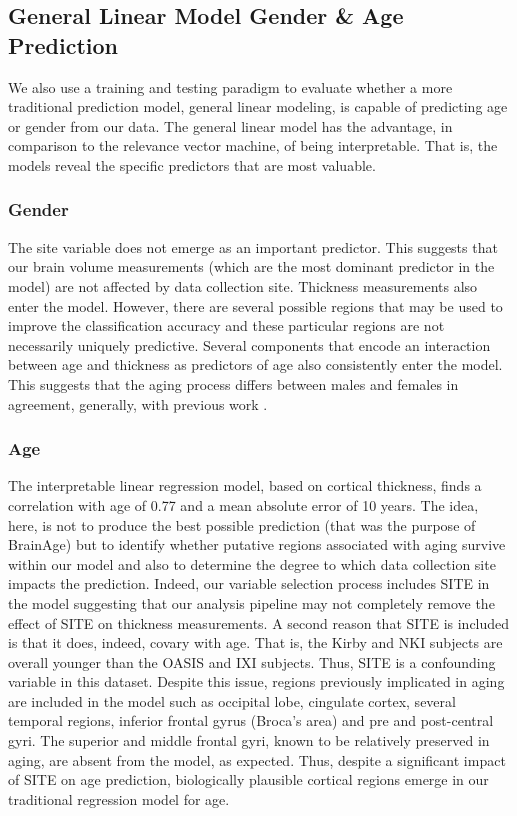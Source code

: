 \subsection{General Linear Model Gender \& Age Prediction} 
We also use a training and testing paradigm to evaluate whether a more
traditional prediction model, general linear modeling, is capable of
predicting age or gender from our data.  The general linear model has
the advantage, in comparison to the relevance vector machine, of being
interpretable.  That is, the models reveal the specific predictors
that are most valuable.  

\subsubsection{Gender} 
The site variable does not emerge as an important predictor.  This
suggests that our brain volume measurements (which are the most
dominant predictor in the model) are not affected by data collection
site.  Thickness measurements also enter the model.  However, there
are several possible regions that may be used to improve the
classification accuracy and these particular regions are not
necessarily uniquely predictive.  Several components that encode an
interaction between age and thickness as predictors of age also
consistently enter the model.  This suggests that the aging process
differs between males and females in agreement, generally, with
previous work \cite{FIXMENeedReference}.

\subsubsection{Age} 
The interpretable linear regression model, based on cortical
thickness, finds a correlation with age of 0.77 and a mean absolute
error of 10 years.  The idea, here, is not to produce the best
possible prediction (that was the purpose of BrainAge) but to identify
whether putative regions associated with aging survive within our
model and also to determine the degree to which data collection site
impacts the prediction.  Indeed, our variable selection process
includes SITE in the model suggesting that our analysis pipeline
may not completely remove the effect of SITE on thickness
measurements.  A second reason that SITE is included is that it does,
indeed, covary with age.  That is, the Kirby and NKI subjects are
overall younger than the OASIS and IXI subjects.  Thus, SITE is a
confounding variable in this dataset.  Despite this issue, regions
previously implicated in aging are included in the model such as
occipital lobe, cingulate cortex, several temporal regions, inferior
frontal gyrus (Broca's area) and pre and post-central gyri.  The
superior and middle frontal gyri, known to be relatively preserved in
aging, are absent from the model, as expected.  Thus, despite a
significant impact of SITE on age prediction, biologically plausible
cortical regions emerge in our traditional regression model for age.  

